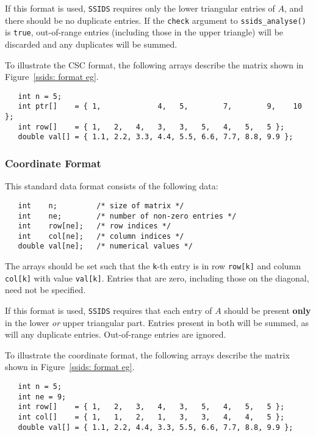 If this format is used, \texttt{SSIDS} requires only the lower triangular entries of $A$, and there 
should be no duplicate entries. If the \texttt{check}
argument to
\texttt{ssids\_analyse()} is \texttt{true}, out-of-range entries (including
those in the upper triangle) will be discarded and any duplicates will be
summed.

To illustrate the CSC format, the following arrays describe the matrix shown in
Figure~\ref{ssids: format eg}.
\begin{verbatim}
   int n = 5;
   int ptr[]    = { 1,             4,   5,        7,        9,    10 };
   int row[]    = { 1,   2,   4,   3,   3,   5,   4,   5,   5 };
   double val[] = { 1.1, 2.2, 3.3, 4.4, 5.5, 6.6, 7.7, 8.8, 9.9 };
\end{verbatim}

\subsubsection{Coordinate Format} \label{ssids: coordformat}
This standard data format consists of the following data:
\begin{verbatim}
   int    n;         /* size of matrix */
   int    ne;        /* number of non-zero entries */
   int    row[ne];   /* row indices */
   int    col[ne];   /* column indices */
   double val[ne];   /* numerical values */
\end{verbatim}
The arrays should be set such that the \texttt{k}-th entry is in row
\texttt{row[k]} and column \texttt{col[k]} with value \texttt{val[k]}.
Entries that are zero, including those on the diagonal, need not be specified.

If this format is used,
\texttt{SSIDS} requires that each entry of $A$ should be present \textbf{only} in the
lower \textit{or} upper triangular part. Entries present in both will be summed, as
will any duplicate entries. Out-of-range entries are ignored.

To illustrate the coordinate format, the following arrays describe the matrix shown in
Figure~\ref{ssids: format eg}.
\begin{verbatim}
   int n = 5;
   int ne = 9;
   int row[]    = { 1,   2,   3,   4,   3,   5,   4,   5,   5 };
   int col[]    = { 1,   1,   2,   1,   3,   3,   4,   4,   5 };
   double val[] = { 1.1, 2.2, 4.4, 3.3, 5.5, 6.6, 7.7, 8.8, 9.9 };
\end{verbatim}


